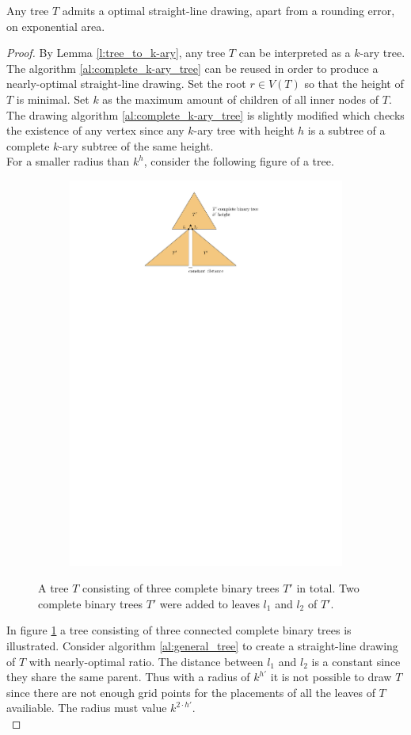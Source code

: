 \begin{theorem}
	Any tree $T$ admits a optimal straight-line drawing, apart from a rounding error, on exponential area.
\end{theorem}
\begin{proof}
	By Lemma \ref{l:tree_to_k-ary}, any tree $T$ can be interpreted as a $k$-ary tree. The algorithm \ref{al:complete_k-ary_tree} can be reused in order to produce a nearly-optimal straight-line drawing. Set the root $r \in V(T)$ so that the height of $T$ is minimal. Set $k$ as the maximum amount of children of all inner nodes of $T$. The drawing algorithm \ref{al:complete_k-ary_tree} is slightly modified which checks the existence of any vertex since any $k$-ary tree with height $h$ is a subtree of a complete $k$-ary subtree of the same height.\\
	For a smaller radius than $k^h$, consider the following figure of a tree.\\
	\begin{figure}[H]
		\centering
		\begin{subfigure}{\textwidth}
			\centering
			\includegraphics[page=1,width=0.6\linewidth]{graphics/tree_worst_case.pdf}
		\end{subfigure}
		\caption{A tree $T$ consisting of three complete binary trees $T'$ in total. Two complete binary trees $T'$ were added to leaves $l_1$ and $l_2$ of $T'$.}\label{im:tree_worst_case}
	\end{figure}
	In figure \ref{im:tree_worst_case} a tree consisting of three connected complete binary trees is illustrated. Consider algorithm \ref{al:general_tree} to create a straight-line drawing of $T$ with nearly-optimal ratio. The distance between $l_1$ and $l_2$ is a constant since they share the same parent. Thus with a radius of $k^{h'}$ it is not possible to draw $T$ since there are not enough grid points for the placements of all the leaves of $T$ availiable. The radius must value $k^{2\cdot h'}$.\\	

\end{proof}
